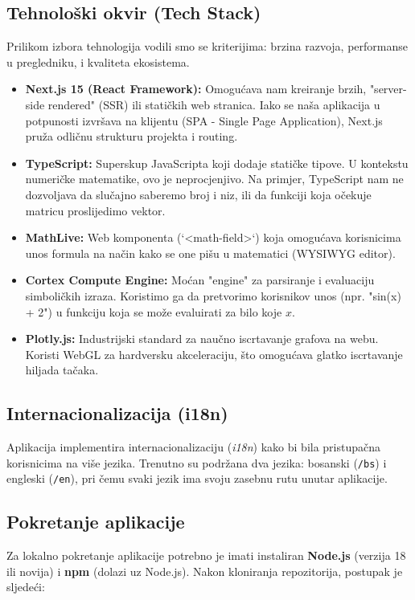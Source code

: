 \documentclass[12pt, a4paper]{article}
\begin{document}
\subsection{Tehnološki okvir (Tech Stack)}
Prilikom izbora tehnologija vodili smo se kriterijima: brzina razvoja, performanse u pregledniku, i kvaliteta ekosistema.
\begin{itemize}
    \item \textbf{Next.js 15 (React Framework):} Omogućava nam kreiranje brzih, "server-side rendered" (SSR) ili statičkih web stranica. Iako se naša aplikacija u potpunosti izvršava na klijentu (SPA - Single Page Application), Next.js pruža odličnu strukturu projekta i routing.
    \item \textbf{TypeScript:} Superskup JavaScripta koji dodaje statičke tipove. U kontekstu numeričke matematike, ovo je neprocjenjivo. Na primjer, TypeScript nam ne dozvoljava da slučajno saberemo broj i niz, ili da funkciji koja očekuje matricu proslijedimo vektor.
    \item \textbf{MathLive:} Web komponenta (`<math-field>`) koja omogućava korisnicima unos formula na način kako se one pišu u matematici (WYSIWYG editor).
    \item \textbf{Cortex Compute Engine:} Moćan "engine" za parsiranje i evaluaciju simboličkih izraza. Koristimo ga da pretvorimo korisnikov unos (npr. "sin(x) + 2") u funkciju koja se može evaluirati za bilo koje $x$.
    \item \textbf{Plotly.js:} Industrijski standard za naučno iscrtavanje grafova na webu. Koristi WebGL za hardversku akceleraciju, što omogućava glatko iscrtavanje hiljada tačaka.
\end{itemize}

\subsection{Internacionalizacija (i18n)}

Aplikacija implementira internacionalizaciju (\textit{i18n}) kako bi bila
pristupačna korisnicima na više jezika. Trenutno su podržana dva jezika:
bosanski (\texttt{/bs}) i engleski (\texttt{/en}), pri čemu svaki jezik ima
svoju zasebnu rutu unutar aplikacije.

\subsection{Pokretanje aplikacije}

Za lokalno pokretanje aplikacije potrebno je imati instaliran
\textbf{Node.js} (verzija 18 ili novija) i \textbf{npm} (dolazi uz Node.js).
Nakon kloniranja repozitorija, postupak je sljedeći:
\end{document}
